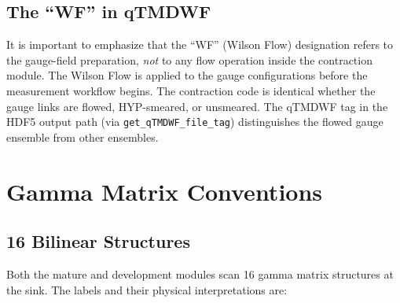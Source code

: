 \documentclass[11pt]{article}
\begin{document}
\subsection{The ``WF'' in qTMDWF}

It is important to emphasize that the ``WF'' (Wilson Flow) designation refers to the gauge-field preparation, \emph{not} to any flow operation inside the contraction module. The Wilson Flow is applied to the gauge configurations before the measurement workflow begins. The contraction code is identical whether the gauge links are flowed, HYP-smeared, or unsmeared. The qTMDWF tag in the HDF5 output path (via \texttt{get\_qTMDWF\_file\_tag}) distinguishes the flowed gauge ensemble from other ensembles.

\section{Gamma Matrix Conventions}
\label{sec:gamma}

\subsection{16 Bilinear Structures}

Both the mature and development modules scan 16 gamma matrix structures at the sink. The labels and their physical interpretations are:
\end{document}
